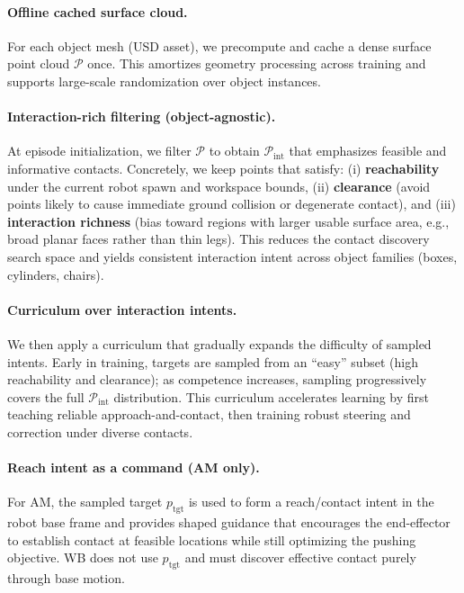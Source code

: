 \paragraph{Offline cached surface cloud.}
For each object mesh (USD asset), we precompute and cache a dense surface point cloud $\mathcal{P}$ once.
This amortizes geometry processing across training and supports large-scale randomization over object instances.

\paragraph{Interaction-rich filtering (object-agnostic).}
At episode initialization, we filter $\mathcal{P}$ to obtain $\mathcal{P}_{\text{int}}$ that emphasizes feasible and informative contacts.
Concretely, we keep points that satisfy:
(i) \textbf{reachability} under the current robot spawn and workspace bounds,
(ii) \textbf{clearance} (avoid points likely to cause immediate ground collision or degenerate contact),
and (iii) \textbf{interaction richness} (bias toward regions with larger usable surface area, e.g., broad planar faces rather than thin legs).
This reduces the contact discovery search space and yields consistent interaction intent across object families (boxes, cylinders, chairs).

\paragraph{Curriculum over interaction intents.}
We then apply a curriculum that gradually expands the difficulty of sampled intents.
Early in training, targets are sampled from an ``easy'' subset (high reachability and clearance); as competence increases,
sampling progressively covers the full $\mathcal{P}_{\text{int}}$ distribution.
This curriculum accelerates learning by first teaching reliable approach-and-contact, then training robust steering and correction under diverse contacts.

\paragraph{Reach intent as a command (AM only).}
For AM, the sampled target $p_{\text{tgt}}$ is used to form a reach/contact intent in the robot base frame and provides shaped guidance
that encourages the end-effector to establish contact at feasible locations while still optimizing the pushing objective.
WB does not use $p_{\text{tgt}}$ and must discover effective contact purely through base motion.

